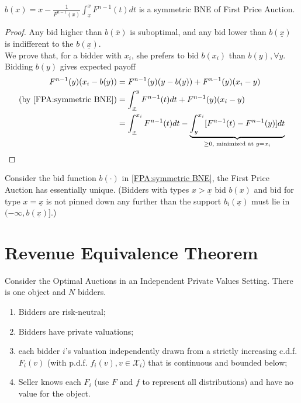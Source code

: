 \documentclass[11pt]{elegantbook}
\begin{document}
\begin{proposition}
    $b(x)=x-\frac{1}{F^{n-1}(x)}\int_{\underline{x}}^x F^{n-1}(t) dt$ is a symmetric BNE of First Price Auction.
\end{proposition}
\begin{proof}
    Any bid higher than $b(\overline{x})$ is suboptimal, and any bid lower than $b(\underline{x})$ is indifferent to the $b(\underline{x})$.\\
    We prove that, for a bidder with $x_i$, she prefers to bid $b(x_i)$ than $b(y),\forall y$.\\
    Bidding $b(y)$ gives expected payoff
    \begin{equation}
        \begin{aligned}
            F^{n-1}(y)(x_i-b(y))&=F^{n-1}(y)(y-b(y))+F^{n-1}(y)(x_i-y)\\
            (\textnormal{by \eqref{FPA:symmetric BNE}})&=\int_{\underline{x}}^y F^{n-1}(t) dt+F^{n-1}(y)(x_i-y)\\
            &=\int_{\underline{x}}^{x_i} F^{n-1}(t) dt-\underbrace{\int_y^{x_i} [F^{n-1}(t)-F^{n-1}(y)] dt}_{\geq 0, \textnormal{ minimized at }y=x_i}
        \end{aligned}
        \nonumber
    \end{equation}
\end{proof}

\begin{theorem}[Lebrun, 1999]
    Consider the bid function $b(\cdot)$ in \eqref{FPA:symmetric BNE}, the First Price Auction has essentially unique. (Bidders with types $x>\underline{x}$ bid $b(x)$ and bid for type $x=\underline{x}$ is not pinned down any further than the support $b_i(\underline{x})$ must lie in $(-\infty,b(\underline{x})]$.)
\end{theorem}





\section{Revenue Equivalence Theorem}
Consider the Optimal Auctions in an Independent Private Values Setting. There is one object and $N$ bidders.
\begin{enumerate}
    \item Bidders are risk-neutral;
    \item Bidders have private valuations;
    \item each bidder $i$'s valuation independently drawn from a strictly increasing c.d.f. $F_i(v)$ (with p.d.f. $f_i(v),v\in \mathcal{X}_i$) that is continuous and bounded below;
    \item Seller knows each $F_i$ (use $F$ and $f$ to represent all distributions) and have no value for the object.
\end{enumerate}
\end{document}
